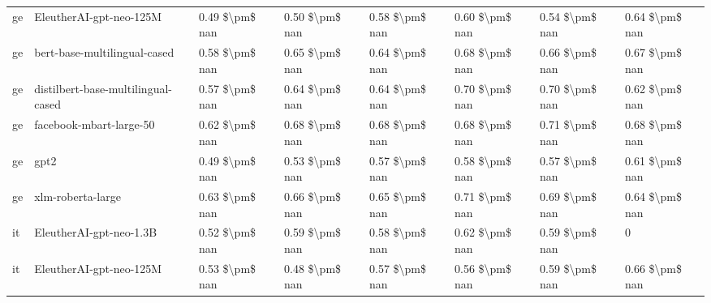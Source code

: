 \begin{tabular}{llllllll}
      ge &            EleutherAI-gpt-neo-125M & 0.49 \$\textbackslash pm\$ nan &            0.50 \$\textbackslash pm\$ nan &        0.58 \$\textbackslash pm\$ nan &         0.60 \$\textbackslash pm\$ nan &                          0.54 \$\textbackslash pm\$ nan &     0.64 \$\textbackslash pm\$ nan \\
      ge &       bert-base-multilingual-cased & 0.58 \$\textbackslash pm\$ nan &            0.65 \$\textbackslash pm\$ nan &        0.64 \$\textbackslash pm\$ nan &         0.68 \$\textbackslash pm\$ nan &                          0.66 \$\textbackslash pm\$ nan &     0.67 \$\textbackslash pm\$ nan \\
      ge & distilbert-base-multilingual-cased & 0.57 \$\textbackslash pm\$ nan &            0.64 \$\textbackslash pm\$ nan &        0.64 \$\textbackslash pm\$ nan &         0.70 \$\textbackslash pm\$ nan &                          0.70 \$\textbackslash pm\$ nan &     0.62 \$\textbackslash pm\$ nan \\
      ge &            facebook-mbart-large-50 & 0.62 \$\textbackslash pm\$ nan &            0.68 \$\textbackslash pm\$ nan &        0.68 \$\textbackslash pm\$ nan &         0.68 \$\textbackslash pm\$ nan &                          0.71 \$\textbackslash pm\$ nan &     0.68 \$\textbackslash pm\$ nan \\
      ge &                               gpt2 & 0.49 \$\textbackslash pm\$ nan &            0.53 \$\textbackslash pm\$ nan &        0.57 \$\textbackslash pm\$ nan &         0.58 \$\textbackslash pm\$ nan &                          0.57 \$\textbackslash pm\$ nan &     0.61 \$\textbackslash pm\$ nan \\
      ge &                  xlm-roberta-large & 0.63 \$\textbackslash pm\$ nan &            0.66 \$\textbackslash pm\$ nan &        0.65 \$\textbackslash pm\$ nan &         0.71 \$\textbackslash pm\$ nan &                          0.69 \$\textbackslash pm\$ nan &     0.64 \$\textbackslash pm\$ nan \\
      it &            EleutherAI-gpt-neo-1.3B & 0.52 \$\textbackslash pm\$ nan &            0.59 \$\textbackslash pm\$ nan &        0.58 \$\textbackslash pm\$ nan &         0.62 \$\textbackslash pm\$ nan &                          0.59 \$\textbackslash pm\$ nan &                  0 \\
      it &            EleutherAI-gpt-neo-125M & 0.53 \$\textbackslash pm\$ nan &            0.48 \$\textbackslash pm\$ nan &        0.57 \$\textbackslash pm\$ nan &         0.56 \$\textbackslash pm\$ nan &                          0.59 \$\textbackslash pm\$ nan &     0.66 \$\textbackslash pm\$ nan \\

\end{tabular}
